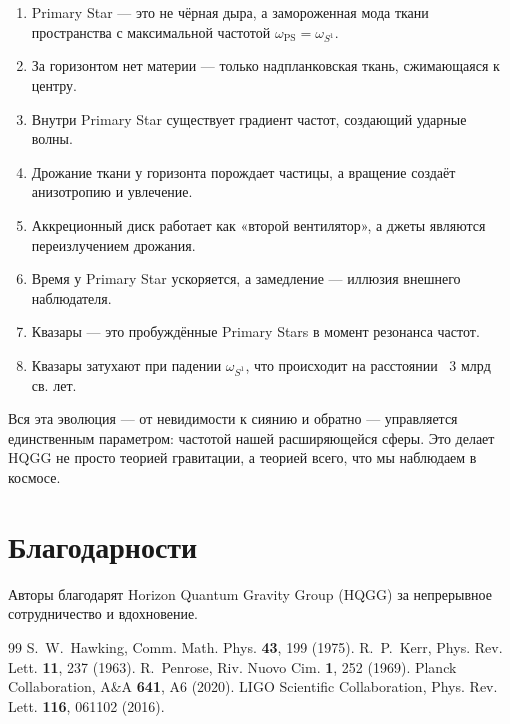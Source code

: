 \documentclass[12pt,a4paper]{article}
\begin{document}
\begin{enumerate}
\item Primary Star — это не чёрная дыра, а замороженная мода ткани пространства с максимальной частотой \(\omega_{\text{PS}} = \omega_{S^1}\).
\item За горизонтом нет материи — только надпланковская ткань, сжимающаяся к центру.
\item Внутри Primary Star существует градиент частот, создающий ударные волны.
\item Дрожание ткани у горизонта порождает частицы, а вращение создаёт анизотропию и увлечение.
\item Аккреционный диск работает как «второй вентилятор», а джеты являются переизлучением дрожания.
\item Время у Primary Star ускоряется, а замедление — иллюзия внешнего наблюдателя.
\item Квазары — это пробуждённые Primary Stars в момент резонанса частот.
\item Квазары затухают при падении \(\omega_{S^1}\), что происходит на расстоянии ~3 млрд св. лет.
\end{enumerate}

Вся эта эволюция — от невидимости к сиянию и обратно — управляется единственным параметром: частотой нашей расширяющейся сферы. Это делает HQGG не просто теорией гравитации, а теорией всего, что мы наблюдаем в космосе.

\begin{center}
\end{center}

\section*{Благодарности}

Авторы благодарят Horizon Quantum Gravity Group (HQGG) за непрерывное сотрудничество и вдохновение.

\begin{thebibliography}{99}
 S.~W.~Hawking, Comm. Math. Phys. \textbf{43}, 199 (1975).
 R.~P.~Kerr, Phys. Rev. Lett. \textbf{11}, 237 (1963).
 R.~Penrose, Riv. Nuovo Cim. \textbf{1}, 252 (1969).
 Planck Collaboration, A\&A \textbf{641}, A6 (2020).
 LIGO Scientific Collaboration, Phys. Rev. Lett. \textbf{116}, 061102 (2016).
\end{thebibliography}
\end{document}
